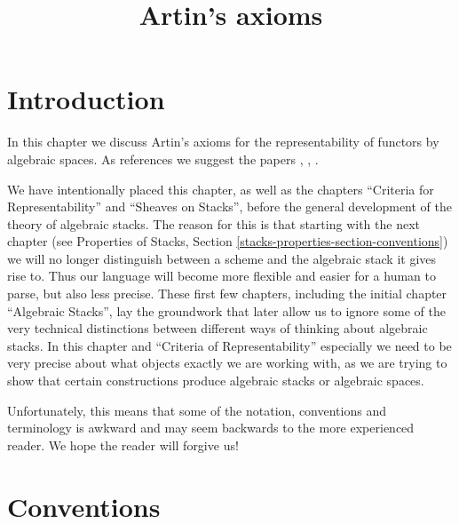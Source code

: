 

%


\title{Artin's axioms}

\maketitle

\label{section-phantom}

\tableofcontents




\section{Introduction}
\label{section-introduction}

\noindent
In this chapter we discuss Artin's axioms for the representability of
functors by algebraic spaces. As references we suggest the papers
\cite{ArtinI}, \cite{ArtinII}, \cite{ArtinVersal}.

\medskip\noindent
We have intentionally placed this chapter, as well as the chapters
``Criteria for Representability'' and ``Sheaves on Stacks'', before the
general development of the theory of algebraic stacks. The reason
for this is that starting with the next chapter (see
Properties of Stacks, Section \ref{stacks-properties-section-conventions})
we will no longer distinguish between a scheme and the algebraic stack
it gives rise to. Thus our language will become more flexible and
easier for a human to parse, but also less precise. These first few
chapters, including the initial chapter ``Algebraic Stacks'', lay the
groundwork that later allow us to ignore some of the very technical
distinctions between different ways of thinking about algebraic stacks.
In this chapter and ``Criteria of Representability'' especially we need
to be very precise about what objects exactly we are working with, as
we are trying to show that certain constructions produce algebraic stacks or
algebraic spaces.

\medskip\noindent
Unfortunately, this means that some of the notation, conventions and
terminology is awkward and may seem backwards to the more experienced
reader. We hope the reader will forgive us!







\section{Conventions}
\label{section-conventions}

